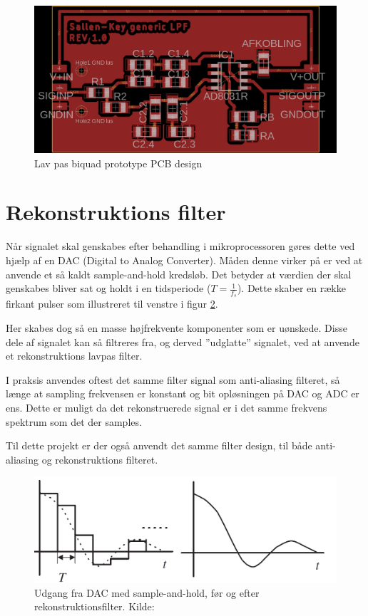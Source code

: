 \begin{figure}[H]
	\centering
	\includegraphics[width=.7\linewidth]{billeder/skbiquadpcb}
	\caption{Lav pas biquad prototype PCB design}
	\label{fig:skbiquadpcb}
\end{figure}

\section{Rekonstruktions filter}

Når signalet skal genskabes efter behandling i mikroprocessoren gøres dette ved hjælp af en DAC (Digital to Analog Converter). 
Måden denne virker på er ved at anvende et så kaldt sample-and-hold kredsløb.
Det betyder at værdien der skal genskabes bliver sat og holdt i en
tidsperiode ($T=\frac{1}{f_s}$). Dette skaber en række firkant pulser som
illustreret til venstre i figur \ref{fig:samplholdrecon}.

Her skabes dog så en masse højfrekvente komponenter som er uønskede.
Disse dele af signalet kan så filtreres fra, og derved ''udglatte'' signalet, ved at anvende et rekonstruktions lavpas filter.

I praksis anvendes oftest det samme filter signal som anti-aliasing filteret,
så længe at sampling frekvensen er konstant og bit opløsningen på DAC og ADC
er ens. Dette er muligt da det rekonstruerede signal er i det samme frekvens
spektrum som det der samples.

Til dette projekt er der også anvendt det samme filter design, til både anti-aliasing og rekonstruktions filteret.

\begin{figure}[H]
	\centering
	\includegraphics[width=0.6\linewidth]{billeder/dacrecon}
	\caption{Udgang fra DAC med sample-and-hold, før og efter rekonstruktionsfilter. Kilde:\cite{Tan2013}}
	\label{fig:samplholdrecon}
\end{figure}
